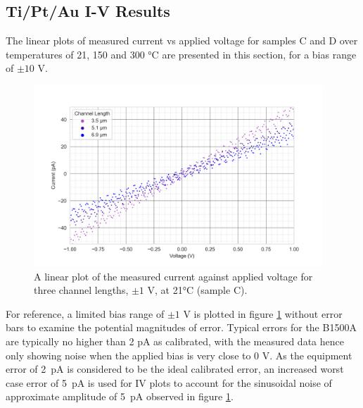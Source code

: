 \begin{refsection}
\subsection{Ti/Pt/Au I-V Results}
\label{subsec:iv_results_ltlm_tiptau}
The linear plots of measured current vs applied voltage for samples C and D over temperatures of 21, 150 and 300 \si{\degreeCelsius} are presented in this section, for a bias range of $\pm10$ \si{\volt}.
\begin{figure}[H]
    \centering
    \includegraphics[width=0.97\textwidth]{Chapter3/Figs/Raster/1V IV characteristics at 21 C.png}
    \caption{A linear plot of the measured current against applied voltage for three channel lengths, $\pm1$ \si{\volt}, at 21\si{\degreeCelsius} (sample C).}
    \label{fig:1V_C_current_voltage_21}
\end{figure}
For reference, a limited bias range of $\pm1$ \si{\volt} is plotted in figure \ref{fig:1V_C_current_voltage_21} without error bars to examine the potential magnitudes of error. Typical errors for the B1500A are typically no higher than 2 \si{\pico\ampere} as calibrated, with the measured data hence only showing noise when the applied bias is very close to 0 \si{\volt}. As the equipment error of 2~\si{\pico\ampere} is considered to be the ideal calibrated error, an increased worst case error of 5~\si{\pico\ampere} is used for IV plots to account for the sinusoidal noise of approximate amplitude of 5~\si{\pico\ampere} observed in figure \ref{fig:1V_C_current_voltage_21}.


\end{refsection}
